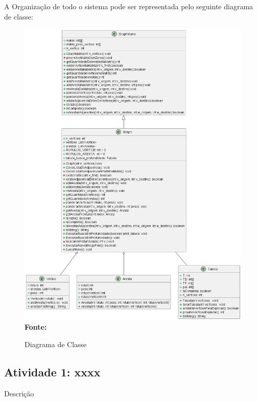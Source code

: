 A Organização de todo o sistema pode ser representada pelo seguinte diagrama de classe:


\begin{figure}[ht]
	\centering	
	\caption[\hspace{0.1cm}Diagrama Classe]{Diagrama de Classe}
	\vspace{-0.4cm}
	\includegraphics[width=1\textwidth]{DiagramaDeClasse/DiagramaDeClasse.png}
	 \vspace{-0.2cm}
	\\\textbf{\footnotesize Fonte: \cite{imagemSoftware} }
	\label{fig:imagemSoftware}
\end{figure}

\subsection{Atividade 1: xxxx}
Descrição

